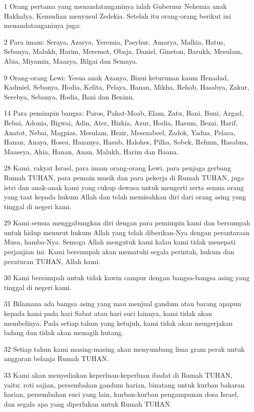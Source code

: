 \par 1 Orang pertama yang menandatanganinya ialah Gubernur Nehemia anak Hakhalya. Kemudian menyusul Zedekia. Setelah itu orang-orang berikut ini menandatanganinya juga:
\par 2 Para imam: Seraya, Azarya, Yeremia, Pasyhur, Amarya, Malkia, Hatus, Sebanya, Malukh, Harim, Meremot, Obaja, Daniel, Gineton, Barukh, Mesulam, Abia, Miyamin, Maazya, Bilgai dan Semaya.
\par 9 Orang-orang Lewi: Yesua anak Azanya, Binui keturunan kaum Henadad, Kadmiel, Sebanya, Hodia, Kelita, Pelaya, Hanan, Mikha, Rehob, Hasabya, Zakur, Serebya, Sebanya, Hodia, Bani dan Beninu.
\par 14 Para pemimpin bangsa: Paros, Pahat-Moab, Elam, Zatu, Bani, Buni, Azgad, Bebai, Adonia, Bigwai, Adin, Ater, Hizkia, Azur, Hodia, Hasum, Bezai, Harif, Anatot, Nebai, Magpias, Mesulam, Hezir, Mesezabeel, Zadok, Yadua, Pelaca, Hanan, Anaya, Hosea, Hananya, Hasub, Halohes, Pilha, Sobek, Rehum, Hasabna, Maaseya, Ahia, Hanan, Anan, Malukh, Harim dan Baana.
\par 28 Kami, rakyat Israel, para imam orang-orang Lewi, para penjaga gerbang Rumah TUHAN, para pemain musik dan para pekerja di Rumah TUHAN, juga istri dan anak-anak kami yang cukup dewasa untuk mengerti serta semua orang yang taat kepada hukum Allah dan telah memisahkan diri dari orang asing yang tinggal di negeri kami.
\par 29 Kami semua menggabungkan diri dengan para pemimpin kami dan bersumpah untuk hidup menurut hukum Allah yang telah diberikan-Nya dengan perantaraan Musa, hamba-Nya. Semoga Allah mengutuk kami kalau kami tidak menepati perjanjian ini. Kami bersumpah akan mematuhi segala perintah, hukum dan peraturan TUHAN, Allah kami.
\par 30 Kami bersumpah untuk tidak kawin campur dengan bangsa-bangsa asing yang tinggal di negeri kami.
\par 31 Bilamana ada bangsa asing yang mau menjual gandum atau barang apapun kepada kami pada hari Sabat atau hari suci lainnya, kami tidak akan membelinya. Pada setiap tahun yang ketujuh, kami tidak akan mengerjakan ladang dan tidak akan menagih hutang.
\par 32 Setiap tahun kami masing-masing akan menyumbang lima gram perak untuk anggaran belanja Rumah TUHAN.
\par 33 Kami akan menyediakan keperluan-keperluan ibadat di Rumah TUHAN, yaitu: roti sajian, persembahan gandum harian, binatang untuk kurban bakaran harian, persembahan suci yang lain, kurban-kurban pengampunan dosa Israel, dan segala apa yang diperlukan untuk Rumah TUHAN.
